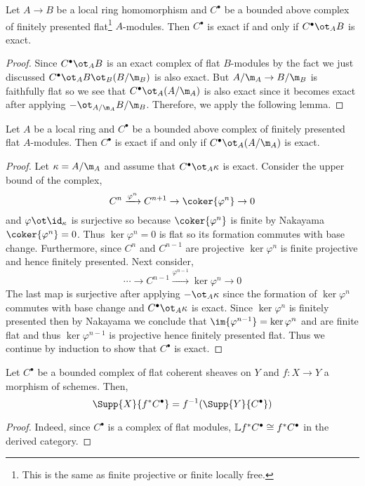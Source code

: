 \documentclass[12pt]{article}
\begin{document}
\begin{lemma}
Let $A \to B$ be a local ring homomorphism and $C^\bullet$ be a bounded above complex of finitely presented flat\footnote{This is the same as finite projective or finite locally free.} $A$-modules. Then $C^\bullet$ is exact if and only if $C^\bullet \ot_A B$ is exact. 
\end{lemma}

\begin{proof}
Since $C^\bullet \ot_A B$ is an exact complex of flat $B$-modules by the fact we just discussed $C^\bullet \ot_A B \ot_B (B / \m_B)$ is also exact. But $A/\m_A \to B/\m_B$ is faithfully flat so we see that $C^\bullet \ot_A (A /\m_A)$ is also exact since it becomes exact after applying $- \ot_{A/\m_A} B / \m_B$. Therefore, we apply the following lemma.
\end{proof}

\begin{lemma}
Let $A$ be a local ring and $C^\bullet$ be a bounded above complex of finitely presented flat $A$-modules. Then $C^\bullet$ is exact if and only if $C^\bullet \ot_A (A/\m_A)$ is exact. 
\end{lemma}

\begin{proof}
Let $\kappa = A / \m_A$ and assume that $C^\bullet \ot_A \kappa$ is exact.
Consider the upper bound of the complex,
\[ C^n \xrightarrow{\varphi^n} C^{n+1} \to \coker{\varphi^n} \to 0 \]
and $\varphi \ot \id_\kappa$ is surjective so because $\coker{\varphi^n}$ is finite by Nakayama $\coker{\varphi^n} = 0$. Thus $\ker{\varphi^n} = 0$ is flat so its formation commutes with base change. Furthermore, since $C^n$ and $C^{n-1}$ are projective $\ker{\varphi^n}$ is finite projective and hence finitely presented. Next consider,
\[ \cdots \to C^{n-1} \xrightarrow{\varphi^{n-1}} \ker{\varphi^n} \to 0 \]
The last map is surjective after applying $- \ot_A \kappa$ since the formation of $\ker{\varphi^n}$ commutes with base change and $C^\bullet \ot_A \kappa$ is exact. Since $\ker{\varphi^n}$ is finitely presented then by Nakayama we conclude that $\im{\varphi^{n-1}} = \ker{\varphi^n}$ and are finite flat and thus $\ker{\varphi^{n-1}}$ is projective hence finitely presented flat. Thus we continue by induction to show that $C^\bullet$ is exact.
\end{proof}

\begin{cor}
Let $C^\bullet$ be a bounded complex of flat coherent sheaves on $Y$ and $f : X \to Y$ a morphism of schemes. Then,
\[ \Supp{X}{f^* C^\bullet} = f^{-1}(\Supp{Y}{C^\bullet}) \]
\end{cor}

\begin{proof}
Indeed, since $C^\bullet$ is a complex of flat modules, $\mathbb{L} f^* C^\bullet \cong f^* C^\bullet$ in the derived category.
\end{proof}
\end{document}

